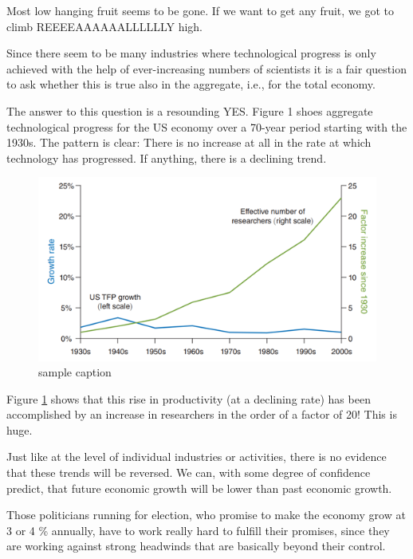 \documentclass[
]{book}
\begin{document}
Most low hanging fruit seems to be gone. If we want to get any fruit, we got to climb REEEEAAAAAALLLLLLY high.

Since there seem to be many industries where technological progress is only achieved with the help of ever-increasing numbers of scientists it is a fair question to ask whether this is true also in the aggregate, i.e., for the total economy.

The answer to this question is a resounding YES. Figure 1 shoes aggregate technological progress for the US economy over a 70-year period starting with the 1930s. The pattern is clear: There is no increase at all in the rate at which technology has progressed. If anything, there is a declining trend.

\begin{figure}

{\centering \includegraphics[width=1\linewidth]{img/growth/moore20} 

}

\caption{sample caption}\label{fig:growth20}
\end{figure}

Figure \ref{fig:growth20} shows that this rise in productivity (at a declining rate) has been accomplished by an increase in researchers in the order of a factor of 20! This is huge.

Just like at the level of individual industries or activities, there is no evidence that these trends will be reversed. We can, with some degree of confidence predict, that future economic growth will be lower than past economic growth.

Those politicians running for election, who promise to make the economy grow at 3 or 4 \% annually, have to work really hard to fulfill their promises, since they are working against strong headwinds that are basically beyond their control.
\end{document}
